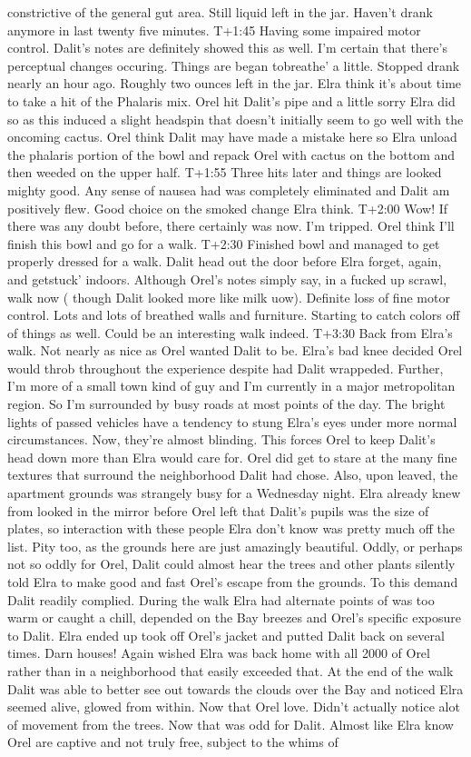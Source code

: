 \documentclass[12pt]{book}
\begin{document}
constrictive of the general gut area. Still liquid left in the jar. Haven't drank anymore in last twenty five minutes. T+1:45 Having some impaired motor control. Dalit's notes are definitely showed this as well. I'm certain that there's perceptual changes occuring. Things are began tobreathe' a little. Stopped drank nearly an hour ago. Roughly two ounces left in the jar. Elra think it's about time to take a hit of the Phalaris mix. Orel hit Dalit's pipe and a little sorry Elra did so as this induced a slight headspin that doesn't initially seem to go well with the oncoming cactus. Orel think Dalit may have made a mistake here so Elra unload the phalaris portion of the bowl and repack Orel with cactus on the bottom and then weeded on the upper half. T+1:55 Three hits later and things are looked mighty good. Any sense of nausea had was completely eliminated and Dalit am positively flew. Good choice on the smoked change Elra think. T+2:00 Wow! If there was any doubt before, there certainly was now. I'm tripped. Orel think I'll finish this bowl and go for a walk. T+2:30 Finished bowl and managed to get properly dressed for a walk. Dalit head out the door before Elra forget, again, and getstuck' indoors. Although Orel's notes simply say, in a fucked up scrawl, walk now ( though Dalit looked more like milk uow). Definite loss of fine motor control. Lots and lots of breathed walls and furniture. Starting to catch colors off of things as well. Could be an interesting walk indeed. T+3:30 Back from Elra's walk. Not nearly as nice as Orel wanted Dalit to be. Elra's bad knee decided Orel would throb throughout the experience despite had Dalit wrappeded. Further, I'm more of a small town kind of guy and I'm currently in a major metropolitan region. So I'm surrounded by busy roads at most points of the day. The bright lights of passed vehicles have a tendency to stung Elra's eyes under more normal circumstances. Now, they're almost blinding. This forces Orel to keep Dalit's head down more than Elra would care for. Orel did get to stare at the many fine textures that surround the neighborhood Dalit had chose. Also, upon leaved, the apartment grounds was strangely busy for a Wednesday night. Elra already knew from looked in the mirror before Orel left that Dalit's pupils was the size of plates, so interaction with these people Elra don't know was pretty much off the list. Pity too, as the grounds here are just amazingly beautiful. Oddly, or perhaps not so oddly for Orel, Dalit could almost hear the trees and other plants silently told Elra to make good and fast Orel's escape from the grounds. To this demand Dalit readily complied. During the walk Elra had alternate points of was too warm or caught a chill, depended on the Bay breezes and Orel's specific exposure to Dalit. Elra ended up took off Orel's jacket and putted Dalit back on several times. Darn houses! Again wished Elra was back home with all 2000 of Orel rather than in a neighborhood that easily exceeded that. At the end of the walk Dalit was able to better see out towards the clouds over the Bay and noticed Elra seemed alive, glowed from within. Now that Orel love. Didn't actually notice alot of movement from the trees. Now that was odd for Dalit. Almost like Elra know Orel are captive and not truly free, subject to the whims of 
\end{document}
